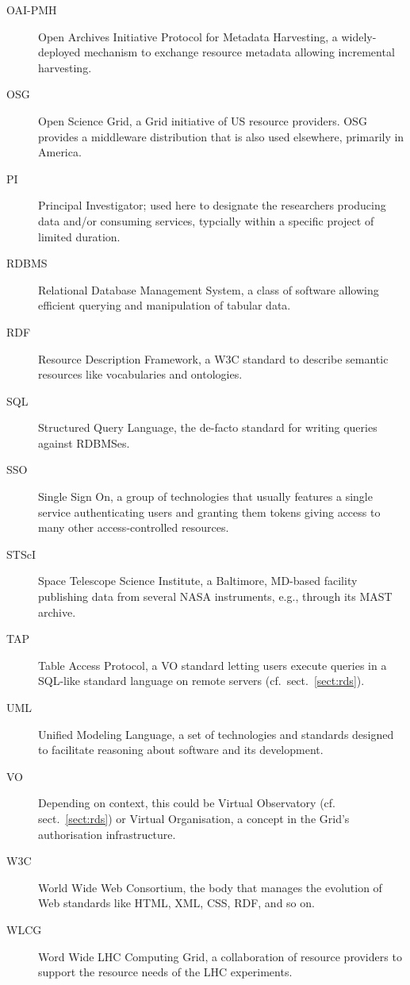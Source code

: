 \begin{description}
\item[OAI-PMH] Open Archives Initiative Protocol for Metadata
Harvesting, a widely-deployed mechanism to exchange resource metadata
allowing incremental harvesting.

\item[OSG] Open Science Grid, a Grid initiative of US resource providers. OSG provides a middleware distribution that is also used elsewhere, primarily in America.

\item[PI] Principal Investigator; used here to designate the researchers
producing data and/or consuming services, typcially within a specific
project of limited duration.

\item[RDBMS] Relational Database Management System, a class of software
allowing efficient querying and manipulation of tabular data.

\item[RDF] Resource Description Framework, a W3C standard to describe
semantic resources like vocabularies and ontologies.

\item[SQL] Structured Query Language, the de-facto standard for writing
queries against RDBMSes.

\item[SSO] Single Sign On, a group of technologies that usually features
a single service authenticating users and granting them tokens giving
access to many other access-controlled resources.

\item[STScI] Space Telescope Science Institute, a Baltimore, MD-based
facility publishing data from several NASA instruments, e.g., through
its MAST archive.

\item[TAP] Table Access Protocol, a VO standard letting users execute
queries in a SQL-like standard language on remote servers
(cf.~sect.~\ref{sect:rds}).

\item[UML] Unified Modeling Language, a set of technologies and standards
designed to facilitate reasoning about software and its development.

\item[VO] Depending on context, this could be Virtual Observatory (cf.
sect.~\ref{sect:rds}) or Virtual Organisation, a concept in the Grid's
authorisation infrastructure.

\item[W3C] World Wide Web Consortium, the body that manages the
evolution of Web standards like HTML, XML, CSS, RDF, and so on.

\item[WLCG] Word Wide LHC Computing Grid, a collaboration of resource providers to support the resource needs of the LHC experiments.

\end{description}
